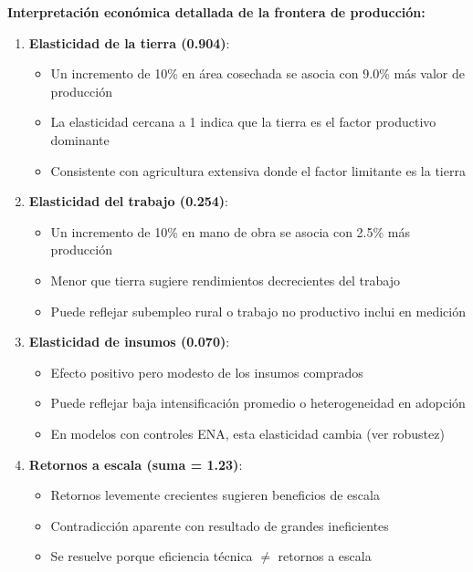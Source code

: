 \documentclass[11pt,a4paper]{article}
\begin{document}
\textbf{Interpretación económica detallada de la frontera de producción:}

\begin{enumerate}
    \item \textbf{Elasticidad de la tierra (0.904)}: 
    \begin{itemize}
        \item Un incremento de 10\% en área cosechada se asocia con 9.0\% más valor de producción
        \item La elasticidad cercana a 1 indica que la tierra es el factor productivo dominante
        \item Consistente con agricultura extensiva donde el factor limitante es la tierra
    \end{itemize}
    
    \item \textbf{Elasticidad del trabajo (0.254)}:
    \begin{itemize}
        \item Un incremento de 10\% en mano de obra se asocia con 2.5\% más producción
        \item Menor que tierra sugiere rendimientos decrecientes del trabajo
        \item Puede reflejar subempleo rural o trabajo no productivo inclui en medición
    \end{itemize}
    
    \item \textbf{Elasticidad de insumos (0.070)}:
    \begin{itemize}
        \item Efecto positivo pero modesto de los insumos comprados
        \item Puede reflejar baja intensificación promedio o heterogeneidad en adopción
        \item En modelos con controles ENA, esta elasticidad cambia (ver robustez)
    \end{itemize}
    
    \item \textbf{Retornos a escala (suma = 1.23)}:
    \begin{itemize}
        \item Retornos levemente crecientes sugieren beneficios de escala
        \item Contradicción aparente con resultado de grandes ineficientes
        \item Se resuelve porque eficiencia técnica $\neq$ retornos a escala
    \end{itemize}
\end{enumerate}
\end{document}
